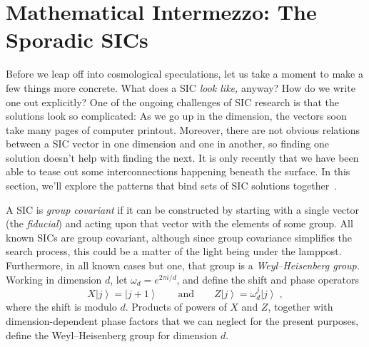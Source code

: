 \documentclass[aps,pra,superscriptaddress,10pt,tightenlines,twocolumn,nofootinbib]{revtex4}
\newcommand{\ket}[1]{{\ensuremath{\left| #1 \right\rangle}}}
\begin{document}
\section{Mathematical Intermezzo: The Sporadic SICs}

Before we leap off into cosmological speculations, let us take a
moment to make a few things more concrete.  What does a SIC {\it look
  like,} anyway?  How do we write one out explicitly?  One of the
ongoing challenges of SIC research is that the solutions look so
complicated: As we go up in the dimension, the vectors soon take many
pages of computer printout.  Moreover, there are not obvious relations
between a SIC vector in one dimension and one in another, so finding
one solution doesn't help with finding the next.  It is only recently
that we have been able to tease out some interconnections happening beneath
the surface.  In this section, we'll explore the patterns that bind
sets of SIC solutions together~\cite{RCF-SIC, stacey-sporadic}.


A SIC is \emph{group covariant} if it can be constructed by starting
with a single vector (the \emph{fiducial}) and acting upon that vector
with the elements of some group.  All known SICs are group covariant,
although since group covariance simplifies the search process, this
could be a matter of the light being under the lamppost.  Furthermore,
in all known cases but one, that group is a \emph{Weyl--Heisenberg group.}
Working in dimension $d$, let $\omega_d = e^{2\pi i / d}$, and define
the shift and phase operators
\begin{equation}
X\ket{j} = \ket{j+1}\qquad \mbox{and}\qquad Z\ket{j} = \omega_d^j \ket{j}\;,
\end{equation}
where the shift is modulo $d$.  Products of powers of $X$ and $Z$,
together with dimension-dependent phase factors that we can neglect
for the present purposes, define the Weyl--Heisenberg group for dimension $d$.
\end{document}
